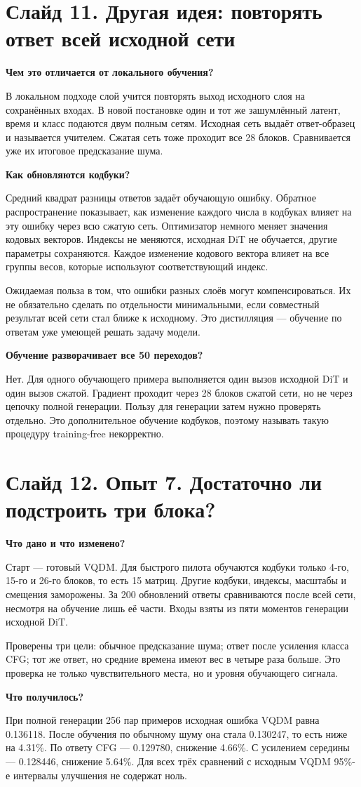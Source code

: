 \documentclass[a4paper,11pt]{article}
\newcommand{\slide}[2]{\clearpage\section*{Слайд #1. #2}}
\newcommand{\question}[1]{\par\textbf{#1}\par}
\begin{document}
\slide{11}{Другая идея: повторять ответ всей исходной сети}
\question{Чем это отличается от локального обучения?}
В локальном подходе слой учится повторять выход исходного слоя на сохранённых
входах. В новой постановке один и тот же зашумлённый латент, время и класс
подаются двум полным сетям. Исходная сеть выдаёт ответ-образец и называется
учителем. Сжатая сеть тоже проходит все 28 блоков. Сравнивается уже их
итоговое предсказание шума.

\question{Как обновляются кодбуки?}
Средний квадрат разницы ответов задаёт обучающую ошибку. Обратное
распространение показывает, как изменение каждого числа в кодбуках
влияет на эту ошибку через всю сжатую сеть. Оптимизатор немного меняет
значения кодовых векторов. Индексы не меняются, исходная DiT не обучается,
другие параметры сохраняются. Каждое изменение кодового вектора влияет
на все группы весов, которые используют соответствующий индекс.

Ожидаемая польза в том, что ошибки разных слоёв могут компенсироваться.
Их не обязательно сделать по отдельности минимальными, если совместный
результат всей сети стал ближе к исходному. Это дистилляция --- обучение
по ответам уже умеющей решать задачу модели.

\question{Обучение разворачивает все 50 переходов?}
Нет. Для одного обучающего примера выполняется один вызов исходной DiT
и один вызов сжатой. Градиент проходит через 28 блоков сжатой сети,
но не через цепочку полной генерации. Пользу для генерации затем
нужно проверять отдельно. Это дополнительное обучение кодбуков,
поэтому называть такую процедуру training-free некорректно.

\slide{12}{Опыт 7. Достаточно ли подстроить три блока?}
\question{Что дано и что изменено?}
Старт --- готовый VQDM. Для быстрого пилота обучаются кодбуки только
4-го, 15-го и 26-го блоков, то есть 15 матриц. Другие кодбуки, индексы,
масштабы и смещения заморожены. За 200 обновлений ответы сравниваются
после всей сети, несмотря на обучение лишь её части.
Входы взяты из пяти моментов генерации исходной DiT.

Проверены три цели: обычное предсказание шума; ответ после усиления класса
CFG; тот же ответ, но средние времена имеют вес в четыре раза больше.
Это проверка не только чувствительного места, но и уровня обучающего сигнала.

\question{Что получилось?}
При полной генерации 256 пар примеров исходная ошибка VQDM равна 0.136118.
После обучения по обычному шуму она стала 0.130247, то есть ниже на 4.31\%.
По ответу CFG --- 0.129780, снижение 4.66\%. С усилением середины ---
0.128446, снижение 5.64\%. Для всех трёх сравнений с исходным VQDM
95\%-е интервалы улучшения не содержат ноль.
\end{document}
